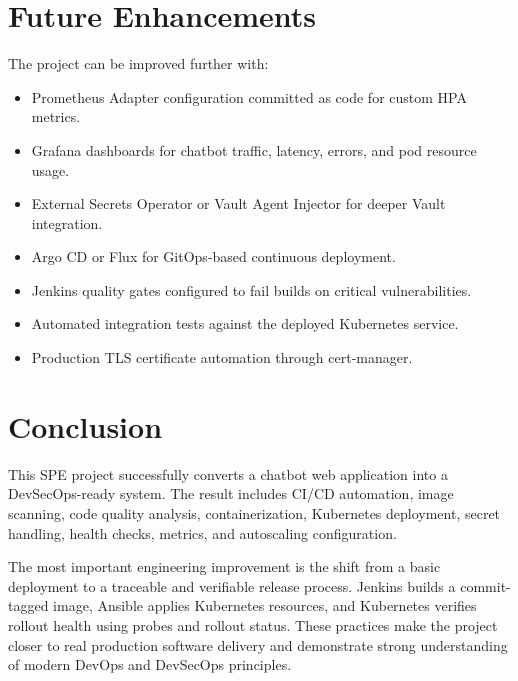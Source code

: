 \documentclass[12pt,a4paper]{article}
\begin{document}
\section{Future Enhancements}

The project can be improved further with:

\begin{itemize}[leftmargin=*]
    \item Prometheus Adapter configuration committed as code for custom HPA metrics.
    \item Grafana dashboards for chatbot traffic, latency, errors, and pod resource usage.
    \item External Secrets Operator or Vault Agent Injector for deeper Vault integration.
    \item Argo CD or Flux for GitOps-based continuous deployment.
    \item Jenkins quality gates configured to fail builds on critical vulnerabilities.
    \item Automated integration tests against the deployed Kubernetes service.
    \item Production TLS certificate automation through cert-manager.
\end{itemize}

\section{Conclusion}

This SPE project successfully converts a chatbot web application into a
DevSecOps-ready system. The result includes CI/CD automation, image scanning,
code quality analysis, containerization, Kubernetes deployment, secret handling,
health checks, metrics, and autoscaling configuration.

The most important engineering improvement is the shift from a basic deployment
to a traceable and verifiable release process. Jenkins builds a commit-tagged
image, Ansible applies Kubernetes resources, and Kubernetes verifies rollout
health using probes and rollout status. These practices make the project closer
to real production software delivery and demonstrate strong understanding of
modern DevOps and DevSecOps principles.
\end{document}

